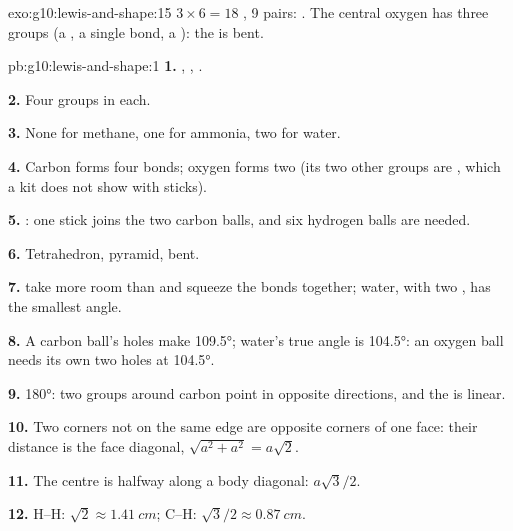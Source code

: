 \begin{solution}{exo:g10:lewis-and-shape:15}
$3 \times 6 = 18$ , 9 pairs:
. The central oxygen
has three groups (a , a single bond, a ): the
 is bent.
\end{solution}

\begin{solution}{pb:g10:lewis-and-shape:1}
\textbf{1.} , ,
.

\textbf{2.} Four groups in each.

\textbf{3.} None for methane, one for ammonia, two for water.

\textbf{4.} Carbon forms four bonds; oxygen forms two (its two other
groups are , which a kit does not show with sticks).

\textbf{5.} : one stick joins
the two carbon balls, and six hydrogen balls are needed.

\textbf{6.} Tetrahedron, pyramid, bent.

\textbf{7.}  take more room than  and squeeze the
bonds together; water, with two , has the smallest angle.

\textbf{8.} A carbon ball's holes make \ang{109.5}; water's true angle is
\ang{104.5}: an oxygen ball needs its own two holes at \ang{104.5}.

\textbf{9.} \ang{180}: two groups around carbon point in opposite
directions, and the  is linear.

\textbf{10.} Two corners not on the same edge are opposite corners of one
face: their distance is the face diagonal, $\sqrt{a^2 + a^2} = a\sqrt{2}$.

\textbf{11.} The centre is halfway along a body diagonal:
$a\sqrt{3}/2$.

\textbf{12.} H--H: $\sqrt{2} \approx \qty{1.41}{cm}$; C--H:
$\sqrt{3}/2 \approx \qty{0.87}{cm}$.


\end{solution}

